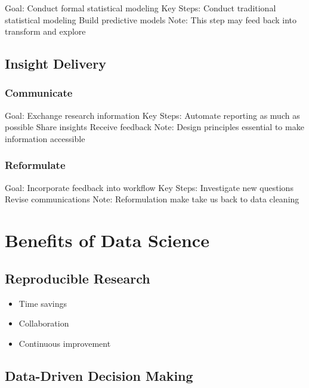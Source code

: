 \documentclass[
]{book}
\providecommand{\tightlist}{%
  \setlength{\itemsep}{0pt}\setlength{\parskip}{0pt}}
\begin{document}
Goal:
Conduct formal statistical modeling
Key Steps:
Conduct traditional statistical modeling
Build predictive models
Note:
This step may feed back into transform and explore

\hypertarget{insight-delivery}{%
\subsection{Insight Delivery}\label{insight-delivery}}

\hypertarget{communicate}{%
\subsubsection{Communicate}\label{communicate}}

Goal:
Exchange research information
Key Steps:
Automate reporting as much as possible
Share insights
Receive feedback
Note:
Design principles essential to make information accessible

\hypertarget{reformulate}{%
\subsubsection{Reformulate}\label{reformulate}}

Goal:
Incorporate feedback into workflow
Key Steps:
Investigate new questions
Revise communications
Note:
Reformulation make take us back to data cleaning

\hypertarget{benefits-of-data-science}{%
\section{Benefits of Data Science}\label{benefits-of-data-science}}

\hypertarget{reproducible-research}{%
\subsection{Reproducible Research}\label{reproducible-research}}

\begin{itemize}
\tightlist
\item
  Time savings
\item
  Collaboration
\item
  Continuous improvement
\end{itemize}

\hypertarget{data-driven-decision-making}{%
\subsection{Data-Driven Decision Making}\label{data-driven-decision-making}}
\end{document}
